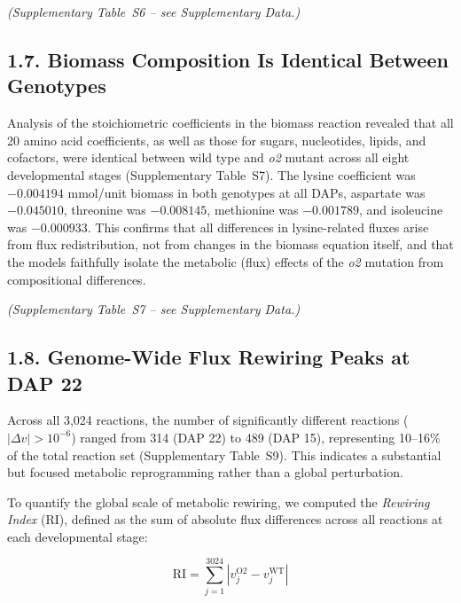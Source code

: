 \documentclass[12pt,a4paper]{article}
\begin{document}
\noindent\textit{(Supplementary Table~S6 -- see Supplementary Data.)}


\subsection{1.7. Biomass Composition Is Identical Between Genotypes}

Analysis of the stoichiometric coefficients in the biomass reaction revealed that all 20 amino acid coefficients, as well as those for sugars, nucleotides, lipids, and cofactors, were identical between wild type and \textit{o2} mutant across all eight developmental stages (Supplementary Table~S7). The lysine coefficient was $-0.004194$ mmol/unit biomass in both genotypes at all DAPs, aspartate was $-0.045010$, threonine was $-0.008145$, methionine was $-0.001789$, and isoleucine was $-0.000933$. This confirms that all differences in lysine-related fluxes arise from flux redistribution, not from changes in the biomass equation itself, and that the models faithfully isolate the metabolic (flux) effects of the \textit{o2} mutation from compositional differences.


\noindent\textit{(Supplementary Table~S7 -- see Supplementary Data.)}


\subsection{1.8. Genome-Wide Flux Rewiring Peaks at DAP 22}

Across all 3,024 reactions, the number of significantly different reactions ($|\Delta v| > 10^{-6}$) ranged from 314 (DAP 22) to 489 (DAP 15), representing 10--16\% of the total reaction set (Supplementary Table~S9). This indicates a substantial but focused metabolic reprogramming rather than a global perturbation.

To quantify the global scale of metabolic rewiring, we computed the \textit{Rewiring Index} (RI), defined as the sum of absolute flux differences across all reactions at each developmental stage:

\begin{equation}
    \mathrm{RI} = \sum_{j=1}^{3024} |v_j^{\mathrm{O2}} - v_j^{\mathrm{WT}}|
\end{equation}
\end{document}
